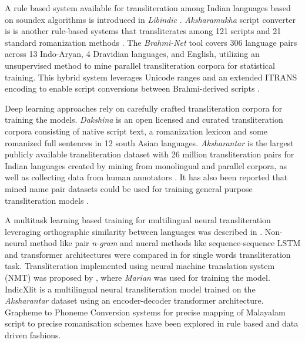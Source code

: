\documentclass[11pt]{article}
\begin{document}
A rule based system available for transliteration among Indian languages based on soundex algorithms is introduced in \textit{Libindic} \cite{libindic}. \textit{Aksharamukha} script converter is is another rule-based systems that transliterates among 121 scripts and 21 standard romanization methods \cite{aksharamukha}. The \textit{Brahmi-Net} tool covers 306 language pairs across 13 Indo-Aryan, 4 Dravidian languages, and English, utilizing an unsupervised method to mine parallel transliteration corpora for statistical training. This hybrid system leverages Unicode ranges and an extended ITRANS encoding to enable script conversions between Brahmi-derived scripts \cite{kunchukuttan-etal-2015-brahmi}.

Deep learning approaches rely on carefully crafted transliteration corpora for training the models. \textit{Dakshina} is an open licensed and curated transliteration corpora \cite{roark-etal-2020-processing} consisting of native script text, a romanization lexicon and some romanized full sentences in 12 south Asian languages. \textit{Aksharantar} is the largest publicly available transliteration dataset with 26 million transliteration pairs for Indian languages created by mining from  monolingual and parallel corpora, as well as collecting data from human annotators \cite{kunchukuttan-etal-2021-large,madhani-etal-2023-aksharantar}. It has also been reported that mined name pair datasets \cite{namepair} could be used for training general purpose transliteration models \cite{Baiju2024}. 

A multitask learning based training for multilingual neural transliteration leveraging orthographic similarity between languages was described in \cite{kunchukuttan2018leveraging}. Non-neural method like pair \textit{n-gram} and nueral methods like sequence-sequence LSTM  and transformer architectures were compared in \citeauthor{roark-etal-2020-processing} for single words transliteration task.
Transliteration implemented using neural machine translation system (NMT) was proposed by \citeauthor{kunchukuttan-etal-2021-large}, where \textit{Marian} \cite{junczys-dowmunt-etal-2018-marian} was used for training the model. IndicXlit is a multilingual neural transliteration model trained on the  \textit{Aksharantar} \cite{madhani-etal-2023-aksharantar} dataset using an encoder-decoder transformer architecture. Grapheme to Phoneme Conversion systems for precise mapping of Malayalam script to precise romanisation schemes have been explored in rule based \cite{baby2016resources,parlikar2016festvox, manghat2020malayalam} and data driven \cite{Priyamvada_2021} fashions.
\end{document}
